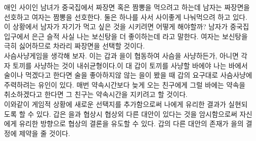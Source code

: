\documentclass{oblivoir}
\begin{document}
애인 사이인 남녀가 중국집에서 짜장면 혹은 짬뽕을 먹으려고 하는데 남자는 짜장면을 선호하고 여자는 짬뽕을 선호한다. 둘은 하나를 사서 사이좋게 나눠먹으려 하고 있다. 이 상황에서 남자가 자기가 먹고 싶은 것을 시키려면 어떻게 해야할까? 남자가 중국집 입구에서 은근 슬적 사실 나는 보신탕을 더 좋이하는데 라고 말한다. 여자는 보신탕을 극히 싫어하므로 차라리 짜장면을 선택할 것이다.\\
사슴사냥게임을 생각해 보자. 이는 갑과 을이 협동하여 사슴을 사냥하든가, 아니면 각자 토끼를 사냥하는 것이 내쉬균형이다.이 대 갑이 토끼를 사냥할 바에야 나는 바에서 술이나 먹겠다고 한다면 술을 좋아하지않 않는 을이 봤을 때 갑의 요구대로 사슴사냥에 주력하려는 유인이 있다.
매번 약속시간보다 늦게 오는 친구에게 그럴 바에는 약속을 취소하겠다고 한다면 그 친구는 약속시간을 지키려고 할 것이다.\\
이와같이 게임적 상황에 새로운 선택지를  추가함으로써 나에게 유리한 결과가 실현되도록 할 수 있다. 갑은 을과 협상시 협상외 다른 대안이 있다는 것을 암시함으로써 자신에게 유리한 방향으로 협상의 결론을 유도할 수 있다. 갑의 다른 대안의 존재가 을의 결정에 제약을 줄 것이다.\\
\end{document}
